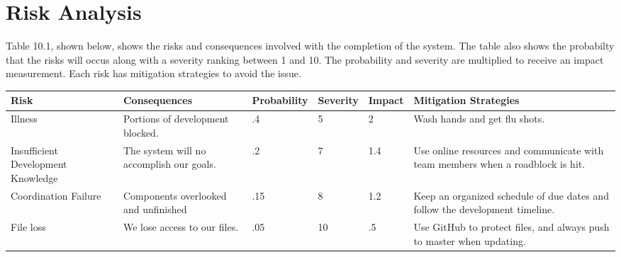 \chapter{Risk Analysis}

Table 10.1, shown below, shows the risks and consequences involved with the completion of the system. The table also shows the probabilty that the risks will occus along with a severity ranking between 1 and 10. The probability and severity are multiplied to receive an impact measurement. Each risk has mitigation strategies to avoid the issue.

\begin{center}
    \begin{tabular}{ | p{3cm} | p{3cm} | l | l | l | p{5cm} |}
    \hline
    Risk & Consequences & Probability & Severity & Impact & Mitigation Strategies \\ \hline
    Illness & Portions of development blocked. & .4 & 5 & 2 & Wash hands and get flu shots. \\ \hline
    Insufficient Development Knowledge & The system will no accomplish our goals. & .2 & 7 & 1.4 & Use online resources and communicate with team members when a roadblock is hit. \\ \hline
    Coordination Failure & Components overlooked and unfinished & .15 & 8 & 1.2 & Keep an organized schedule of due dates and follow the development timeline. \\ \hline
    File loss & We lose access to our files. & .05 & 10 & .5 & Use GitHub to protect files, and always push to master when updating. \\
    \hline
    \end{tabular}
\end{center}
